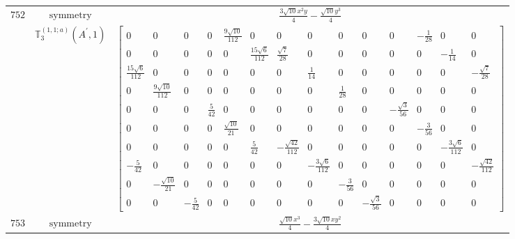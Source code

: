 \documentclass[fleqn,8pt,landscape]{jsarticle}
\begin{document}
\begin{longtable}{ccc}
$ 752 $ & $ \text{symmetry} $ & $ \frac{3 \sqrt{10} x^{2} y}{4} - \frac{\sqrt{10} y^{3}}{4} $ \\
$  $ & $ \mathbb{T}_{3}^{(1,1;a)}(A^{\prime},1) $ & $ \begin{bmatrix} 0 & 0 & 0 & 0 & \frac{9 \sqrt{10}}{112} & 0 & 0 & 0 & 0 & 0 & 0 & - \frac{1}{28} & 0 & 0 \\ 0 & 0 & 0 & 0 & 0 & \frac{15 \sqrt{6}}{112} & \frac{\sqrt{7}}{28} & 0 & 0 & 0 & 0 & 0 & - \frac{1}{14} & 0 \\ \frac{15 \sqrt{6}}{112} & 0 & 0 & 0 & 0 & 0 & 0 & \frac{1}{14} & 0 & 0 & 0 & 0 & 0 & - \frac{\sqrt{7}}{28} \\ 0 & \frac{9 \sqrt{10}}{112} & 0 & 0 & 0 & 0 & 0 & 0 & \frac{1}{28} & 0 & 0 & 0 & 0 & 0 \\ 0 & 0 & 0 & \frac{5}{42} & 0 & 0 & 0 & 0 & 0 & 0 & - \frac{\sqrt{3}}{56} & 0 & 0 & 0 \\ 0 & 0 & 0 & 0 & \frac{\sqrt{10}}{21} & 0 & 0 & 0 & 0 & 0 & 0 & - \frac{3}{56} & 0 & 0 \\ 0 & 0 & 0 & 0 & 0 & \frac{5}{42} & - \frac{\sqrt{42}}{112} & 0 & 0 & 0 & 0 & 0 & - \frac{3 \sqrt{6}}{112} & 0 \\ - \frac{5}{42} & 0 & 0 & 0 & 0 & 0 & 0 & - \frac{3 \sqrt{6}}{112} & 0 & 0 & 0 & 0 & 0 & - \frac{\sqrt{42}}{112} \\ 0 & - \frac{\sqrt{10}}{21} & 0 & 0 & 0 & 0 & 0 & 0 & - \frac{3}{56} & 0 & 0 & 0 & 0 & 0 \\ 0 & 0 & - \frac{5}{42} & 0 & 0 & 0 & 0 & 0 & 0 & - \frac{\sqrt{3}}{56} & 0 & 0 & 0 & 0 \end{bmatrix} $ \\ \hline
$ 753 $ & $ \text{symmetry} $ & $ \frac{\sqrt{10} x^{3}}{4} - \frac{3 \sqrt{10} x y^{2}}{4} $ \\

\end{longtable}
\end{document}

